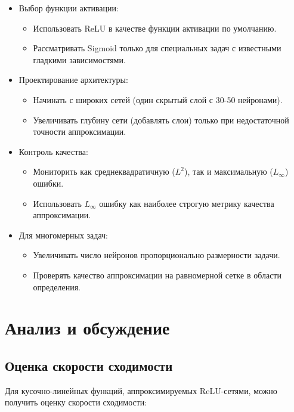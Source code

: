\documentclass[12pt]{article}
\begin{document}
\begin{itemize}
	\item Выбор функции активации: 
	\begin{itemize}
		\item Использовать ReLU в качестве функции активации по умолчанию.
		\item Рассматривать Sigmoid только для специальных задач с известными гладкими зависимостями.
	\end{itemize}
	
	\item Проектирование архитектуры:
	\begin{itemize}
		\item Начинать с широких сетей (один скрытый слой с 30-50 нейронами).
		\item Увеличивать глубину сети (добавлять слои) только при недостаточной точности аппроксимации.
	\end{itemize}
	
	\item Контроль качества:
	\begin{itemize}
		\item Мониторить как среднеквадратичную ($L^2$), так и максимальную ($L_\infty$) ошибки.
		\item Использовать $L_\infty$ ошибку как наиболее строгую метрику качества аппроксимации.
	\end{itemize}
	
	\item Для многомерных задач:
	\begin{itemize}
		\item Увеличивать число нейронов пропорционально размерности задачи.
		\item Проверять качество аппроксимации на равномерной сетке в области определения.
	\end{itemize}
\end{itemize}
	
	\section{Анализ и обсуждение}
	
	\subsection{Оценка скорости сходимости}
	
	Для кусочно-линейных функций, аппроксимируемых ReLU-сетями, можно получить оценку скорости сходимости:
	
\end{document}
